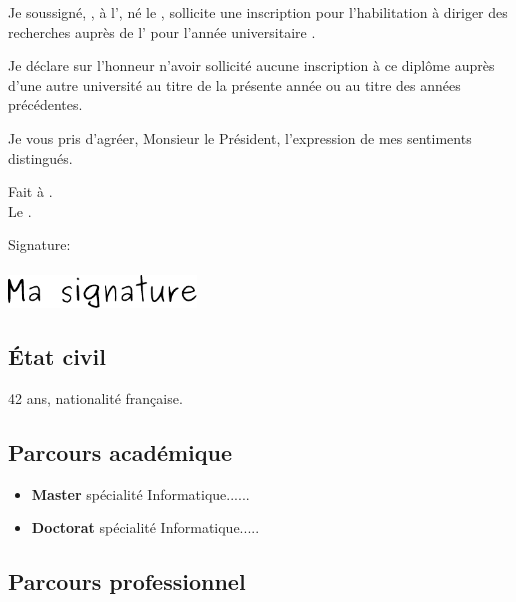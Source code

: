 \documentclass[french]{hdrapplication}
\begin{document}
 

Je soussigné, ,  à l', né le , sollicite une inscription pour l'habilitation à diriger des recherches auprès de l' pour l'année universitaire .


Je déclare sur l'honneur n'avoir sollicité aucune inscription à ce diplôme auprès d'une autre université au titre de la présente année ou au titre des années précédentes.


Je vous pris d'agréer, Monsieur le Président, l'expression de mes sentiments distingués.

\vspace{1cm}
Fait à . \\
Le .


\vspace{1cm}
\noindent Signature: \\
\vspace{.25cm}
\textbf{\large{}} \\[.5cm]
\includegraphics[width=5cm]{imgs/signature}
\newpage




\subsection{\'Etat civil}

42 ans, nationalité française.

\subsection{Parcours académique}

\begin{itemize}
\item \textbf{Master} spécialité Informatique......
\item \textbf{Doctorat} spécialité Informatique.....
\end{itemize}

\subsection{Parcours professionnel}
\end{document}
